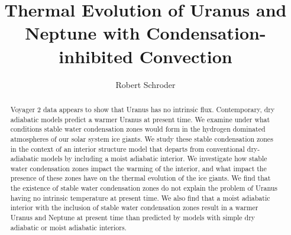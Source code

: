 \documentclass[11pt]{ucscthesisbs}
\begin{document}

\title{Thermal Evolution of Uranus and Neptune with Condensation-inhibited Convection}
\author{Robert Schroder}
%

%





\maketitle
\copyrightpage

\begin{frontmatter}

\begin{abstract}
Voyager 2 data appears to show that Uranus has no intrinsic flux. Contemporary, dry adiabatic models predict a warmer Uranus at present time. We examine under what conditions stable water condensation zones would form in the hydrogen dominated atmospheres of our solar system ice giants. We study these stable condensation zones in the context of an interior structure model that departs from conventional dry-adiabatic models by including a moist adiabatic interior. We investigate how stable water condensation zones impact the warming of the interior, and what impact the presence of these zones have on the thermal evolution of the ice giants. We find that the existence of stable water condensation zones do not explain the problem of Uranus having no intrinsic temperature at present time. We also find that a moist adiabatic interior with the inclusion of stable water condensation zones result in a warmer Uranus and Neptune at present time than predicted by models with simple dry adiabatic or moist adiabatic interiors.
\end{abstract}

\tableofcontents
%
%
\listoffigures


\end{frontmatter}
\end{document}
